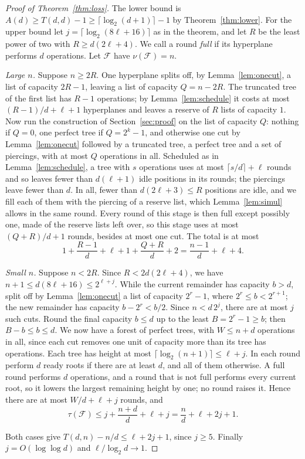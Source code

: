 \documentclass[11pt]{amsart}
\theoremstyle{remark}
\newcommand{\F}{\mathcal F}
\newcommand{\ceil}[1]{\lceil #1\rceil}
\begin{document}
\begin{proof}[Proof of Theorem~\ref{thm:loss}]
The lower bound is $A(d)\ge T(d,d)-1\ge\ceil{\log_2(d+1)}-1$ by Theorem~\ref{thm:lower}. For the upper bound let
$j=\ceil{\log_2(8\ell+16)}$ as in the theorem, and let $R$ be the least power of two with $R\ge d(2\ell+4)$. We call
a round \emph{full} if its hyperplane performs $d$ operations. Let $\F$ have $\nu(\F)=n$.

\emph{Large $n$.} Suppose $n\ge2R$. One hyperplane splits off, by Lemma~\ref{lem:onecut}, a list of capacity $2R-1$, leaving
a list of capacity $Q=n-2R$. The truncated tree of the first list has $R-1$ operations; by Lemma~\ref{lem:schedule} it
costs at most $(R-1)/d+\ell+1$ hyperplanes and leaves a reserve of $R$ lists of capacity $1$. Now run the construction
of Section~\ref{sec:proof} on the list of capacity $Q$: nothing if $Q=0$, one perfect tree if $Q=2^k-1$, and otherwise one
cut by Lemma~\ref{lem:onecut} followed by a truncated tree, a perfect tree and a set of piercings, with at most $Q$
operations in all. Scheduled as in Lemma~\ref{lem:schedule}, a tree with $s$ operations uses at most $\ceil{s/d}+\ell$
rounds and so leaves fewer than $d(\ell+1)$ idle positions in its rounds; the piercings leave fewer than $d$. In all,
fewer than $d(2\ell+3)\le R$ positions are idle, and we fill each of them with the piercing of a reserve list, which
Lemma~\ref{lem:simul} allows in the same round. Every round of this stage is then full except possibly one, made of the
reserve lists left over, so this stage uses at most $(Q+R)/d+1$ rounds, besides at most one cut. The total is at most
\[
1+\frac{R-1}d+\ell+1+\frac{Q+R}d+2=\frac{n-1}d+\ell+4 .
\]

\emph{Small $n$.} Suppose $n<2R$. Since $R<2d(2\ell+4)$, we have $n+1\le d(8\ell+16)\le2^{\ell+j}$. While the current
remainder has capacity $b>d$, split off by Lemma~\ref{lem:onecut} a list of capacity $2^r-1$, where $2^r\le b<2^{r+1}$;
the new remainder has capacity $b-2^r<b/2$. Since $n<d\,2^j$, there are at most $j$ such cuts. Round the final capacity
$b\le d$ up to the least $B=2^r-1\ge b$; then $B-b\le b\le d$. We now have a forest of perfect trees, with
$W\le n+d$ operations in all, since each cut removes one unit of capacity more than its tree has operations. Each tree
has height at most $\ceil{\log_2(n+1)}\le\ell+j$. In each round perform $d$ ready roots if there are at least $d$, and
all of them otherwise. A full round performs $d$ operations, and a round that is not full performs every current root,
so it lowers the largest remaining height by one; no round raises it. Hence there are at most $W/d+\ell+j$ rounds, and
\[
\tau(\F)\le j+\frac{n+d}d+\ell+j=\frac nd+\ell+2j+1 .
\]

Both cases give $T(d,n)-n/d\le\ell+2j+1$, since $j\ge5$. Finally $j=O(\log\log d)$ and $\ell/\log_2 d\to1$.
\end{proof}
\end{document}
